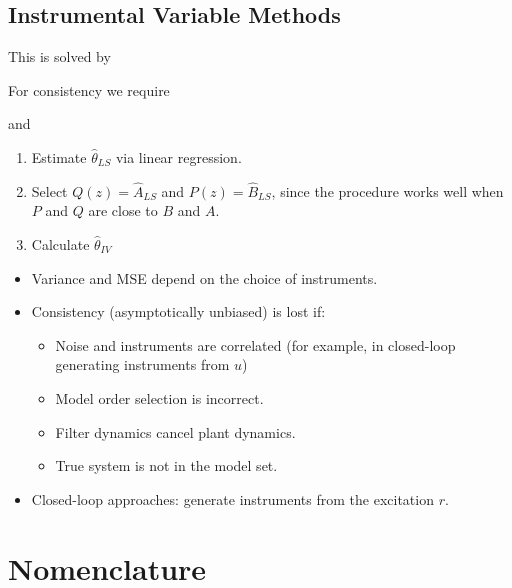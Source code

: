 \documentclass[10pt,a4paper]{scrartcl}
\begin{document}
\begin{multicols*}{2}
\subsection{Instrumental Variable Methods}


This is solved by


For consistency we require


and 



\begin{enumerate}
\item Estimate $\hat{\theta}_{LS}$ via linear regression.
\item Select $Q(z)=\hat{A}_{LS}$ and $P(z)=\hat{B}_{LS}$, since the procedure works well when $P$ and $Q$ are close to $B$ and $A$.
\item Calculate $\hat{\theta}_{IV}$
\end{enumerate}

\begin{itemize}
\item Variance and MSE depend on the choice of instruments.
\item Consistency (asymptotically unbiased) is lost if:
\begin{itemize}
\item Noise and instruments are correlated (for example, in closed-loop generating instruments from $u$)
\item Model order selection is incorrect.
\item Filter dynamics cancel plant dynamics.
\item True system is not in the model set.
\end{itemize}
\item Closed-loop approaches: generate instruments from the excitation $r$.
\end{itemize}

\section{Nomenclature}


\end{multicols*}
\end{document}
